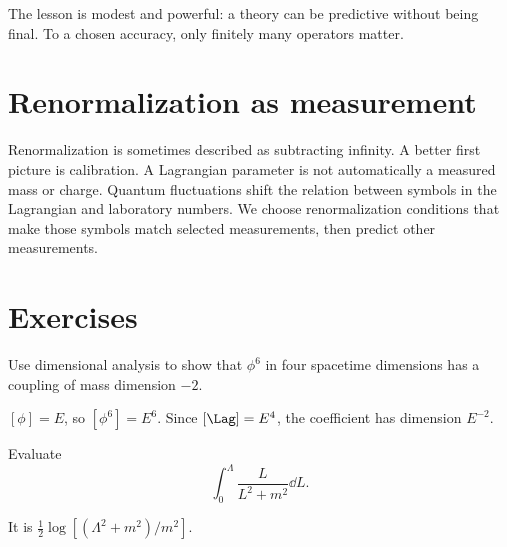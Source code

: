 The lesson is modest and powerful: a theory can be predictive without being final.  To a chosen accuracy, only finitely many operators matter.

\section{Renormalization as measurement}

Renormalization is sometimes described as subtracting infinity.  A better first picture is calibration.  A Lagrangian parameter is not automatically a measured mass or charge.  Quantum fluctuations shift the relation between symbols in the Lagrangian and laboratory numbers.  We choose renormalization conditions that make those symbols match selected measurements, then predict other measurements.

\section*{Exercises}

\begin{exercise}
Use dimensional analysis to show that \(\phi^6\) in four spacetime dimensions has a coupling of mass dimension \(-2\).
\begin{answer}
\([\phi]=E\), so \([\phi^6]=E^6\).  Since \([\Lag]=E^4\), the coefficient has dimension \(E^{-2}\).
\end{answer}
\end{exercise}

\begin{exercise}
Evaluate
\[
  \int_0^\Lambda\frac{L}{L^2+m^2}\dd L.
\]
\begin{answer}
It is \(\frac12\log[(\Lambda^2+m^2)/m^2]\).
\end{answer}
\end{exercise}

